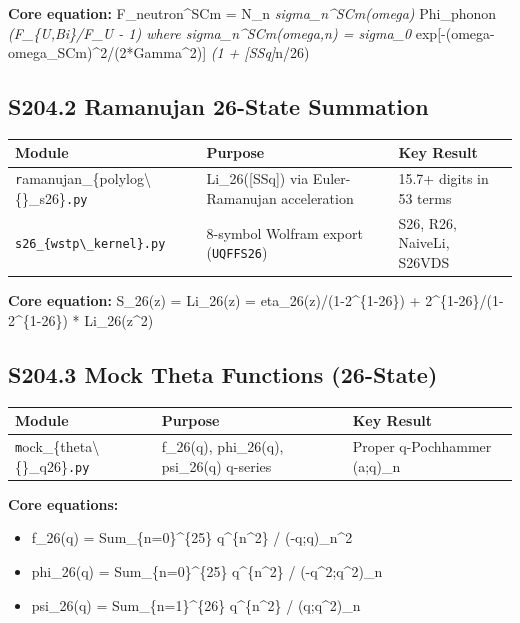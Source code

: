 \documentclass[11pt]{article}
\begin{document}
\textbf{Core equation:} F\_neutron\textasciicircum{}SCm = N\_n \emph{ sigma\_n\textasciicircum{}SCm(omega) } Phi\_phonon \emph{ (F\_\{U,Bi\}/F\_U - 1) where sigma\_n\textasciicircum{}SCm(omega,n) = sigma\_0 } exp[-(omega-omega\_SCm)\textasciicircum{}2/(2*Gamma\textasciicircum{}2)] \emph{ (1 + [SSq]}n/26)

\subsection*{S204.2 Ramanujan 26-State Summation}

\begin{center}
\begin{longtable}{lll}
\toprule
Module & Purpose & Key Result \tabularnewline
\midrule
\endhead
\verb|r|amanujan\_\{polylog\textbackslash\{\}\_s26\}\verb|.py| & Li\_26([SSq]) via Euler-Ramanujan acceleration & 15.7+ digits in 53 terms \tabularnewline
\verb|s26_{wstp\_kernel}.py| & 8-symbol Wolfram export (\verb|UQFFS26|) & S26, R26, NaiveLi, S26VDS \tabularnewline
\bottomrule
\end{longtable}
\end{center}

\textbf{Core equation:} S\_26(z) = Li\_26(z) = eta\_26(z)/(1-2\textasciicircum{}\{1-26\}) + 2\textasciicircum{}\{1-26\}/(1-2\textasciicircum{}\{1-26\}) * Li\_26(z\textasciicircum{}2)

\subsection*{S204.3 Mock Theta Functions (26-State)}

\begin{center}
\begin{longtable}{lll}
\toprule
Module & Purpose & Key Result \tabularnewline
\midrule
\endhead
\verb|m|ock\_\{theta\textbackslash\{\}\_q26\}\verb|.py| & f\_26(q), phi\_26(q), psi\_26(q) q-series & Proper q-Pochhammer (a;q)\_n \tabularnewline
\bottomrule
\end{longtable}
\end{center}

\textbf{Core equations:}

\begin{itemize}
  \item f\_26(q) = Sum\_\{n=0\}\textasciicircum{}\{25\} q\textasciicircum{}\{n\textasciicircum{}2\} / (-q;q)\_n\textasciicircum{}2
  \item phi\_26(q) = Sum\_\{n=0\}\textasciicircum{}\{25\} q\textasciicircum{}\{n\textasciicircum{}2\} / (-q\textasciicircum{}2;q\textasciicircum{}2)\_n
  \item psi\_26(q) = Sum\_\{n=1\}\textasciicircum{}\{26\} q\textasciicircum{}\{n\textasciicircum{}2\} / (q;q\textasciicircum{}2)\_n
\end{itemize}
\end{document}

